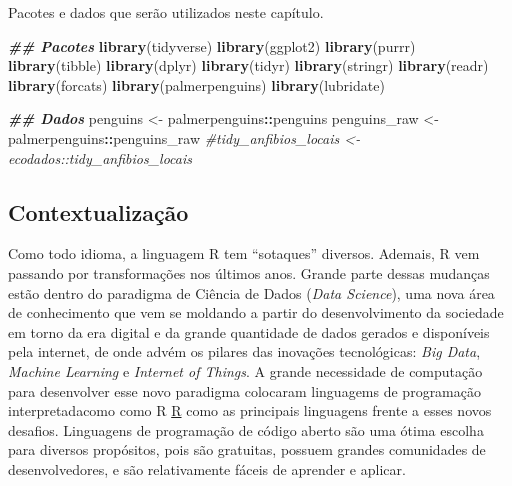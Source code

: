 \documentclass[
]{article}
\newenvironment{Shaded}{\begin{snugshade}}{\end{snugshade}}
\newcommand{\CommentTok}[1]{\textcolor[rgb]{0.56,0.35,0.01}{\textit{#1}}}
\newcommand{\DocumentationTok}[1]{\textcolor[rgb]{0.56,0.35,0.01}{\textbf{\textit{#1}}}}
\newcommand{\FunctionTok}[1]{\textcolor[rgb]{0.13,0.29,0.53}{\textbf{#1}}}
\newcommand{\NormalTok}[1]{#1}
\newcommand{\OtherTok}[1]{\textcolor[rgb]{0.56,0.35,0.01}{#1}}
\newcommand{\SpecialCharTok}[1]{\textcolor[rgb]{0.81,0.36,0.00}{\textbf{#1}}}
\begin{document}
Pacotes e dados que serão utilizados neste capítulo.

\begin{Shaded}
\begin{Highlighting}[]
\DocumentationTok{\#\# Pacotes}
\FunctionTok{library}\NormalTok{(tidyverse)}
\FunctionTok{library}\NormalTok{(ggplot2)}
\FunctionTok{library}\NormalTok{(purrr)}
\FunctionTok{library}\NormalTok{(tibble)}
\FunctionTok{library}\NormalTok{(dplyr)}
\FunctionTok{library}\NormalTok{(tidyr)}
\FunctionTok{library}\NormalTok{(stringr)}
\FunctionTok{library}\NormalTok{(readr)}
\FunctionTok{library}\NormalTok{(forcats)}
\FunctionTok{library}\NormalTok{(palmerpenguins)}
\FunctionTok{library}\NormalTok{(lubridate)}

\DocumentationTok{\#\# Dados}
\NormalTok{penguins }\OtherTok{\textless{}{-}}\NormalTok{ palmerpenguins}\SpecialCharTok{::}\NormalTok{penguins}
\NormalTok{penguins\_raw }\OtherTok{\textless{}{-}}\NormalTok{ palmerpenguins}\SpecialCharTok{::}\NormalTok{penguins\_raw}
\CommentTok{\#tidy\_anfibios\_locais \textless{}{-} ecodados::tidy\_anfibios\_locais}
\end{Highlighting}
\end{Shaded}

\hypertarget{contextualizauxe7uxe3o-1}{%
\subsection{Contextualização}\label{contextualizauxe7uxe3o-1}}

Como todo idioma, a linguagem R tem ``sotaques'' diversos. Ademais, R vem passando por transformações nos últimos anos. Grande parte dessas mudanças estão dentro do paradigma de Ciência de Dados (\emph{Data Science}), uma nova área de conhecimento que vem se moldando a partir do desenvolvimento da sociedade em torno da era digital e da grande quantidade de dados gerados e disponíveis pela internet, de onde advém os pilares das inovações tecnológicas: \emph{Big Data}, \emph{Machine Learning} e \emph{Internet of Things}. A grande necessidade de computação para desenvolver esse novo paradigma colocaram linguagems de programação interpretadacomo como R \href{https://www.r-project.org/}{R} como as principais linguagens frente a esses novos desafios. Linguagens de programação de código aberto são uma ótima escolha para diversos propósitos, pois são gratuitas, possuem grandes comunidades de desenvolvedores, e são relativamente fáceis de aprender e aplicar.
\end{document}

